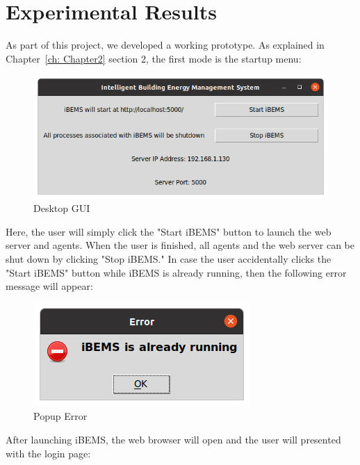 \chapter{Experimental Results}
\label{ch: Chapter4}

As part of this project, we developed a working prototype. As explained in Chapter~\ref{ch: Chapter2} section 2, the first mode is the startup menu:

\begin{figure}[H]
    \centering
    \includegraphics[scale=0.5]{figs/BEMS_GUI_Linux.png}
    \caption{Desktop GUI}
    \label{fig:desktopgui}
\end{figure}

\noindent
Here, the user will simply click the "Start iBEMS" button to launch the web
server and agents. When the user is finished, all agents and the web server can
be shut down by clicking "Stop iBEMS." In case the user accidentally clicks the
"Start iBEMS" button while iBEMS is already running, then the following error
message will appear:


\begin{figure}[H]
    \centering
    \includegraphics[scale=0.5]{figs/BEMS_GUI_Linux_Warning.png}
    \caption{Popup Error}
    \label{fig:popuperror}
\end{figure}

\noindent
After launching iBEMS, the web browser will open and the user will presented with the login page:

